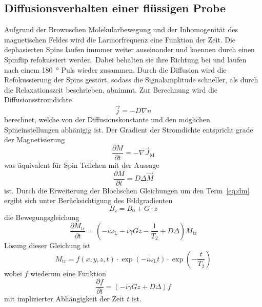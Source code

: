 \subsection{Diffusionsverhalten einer flüssigen Probe}%
\label{sub:relaxationsverhalten_einer_fluessigen_probe}
Aufgrund der Brownschen Molekularbewegung und der Inhomogenität des
magnetischen Feldes wird die Larmorfrequenz eine Funktion der Zeit. 
Die dephasierten Spins laufen immmer weiter auseinander und koennen durch einen
Spinflip refokussiert werden.
Dabei behalten sie ihre Richtung bei und laufen nach einem \SI{180}{\degree}
Puls wieder zusammen.
Durch die Diffusion wird die Refokussierung der Spins gestört, sodass die
Signalamplitude schneller, als durch die Relaxationszeit beschrieben, abnimmt.
Zur Berechnung wird die Diffusionsstromdichte 
\begin{equation}
		\vec{j} = -D \nabla n	
\end{equation}
berechnet, welche von der Diffusionskonstante und den möglichen
Spineinstellungen abhänigig ist. 
Der Gradient der Stromdichte entspricht grade der Magnetisierung
\begin{equation}
		\frac{\partial M}{\partial t} = - \nabla \vec{J}_\text{M}
\end{equation}
was äquivalent für Spin  Teilchen mit der Aussage 
\begin{equation}
		\label{eq:dm}
		\frac{\partial M}{\partial t} = D \Delta \vec{M}
\end{equation}
ist. Durch die Erweiterung der Blochschen Gleichungen um den Term~\ref{eq:dm}
ergibt sich unter Berücksichtigung des Feldgradienten
\begin{equation}
		\label{eq:gradB}
		B_\text{z} = B_0 + G \cdot z
\end{equation}
die Bewegungsgleichung
\begin{equation}
		\frac{\partial M_\text{tr}}{\partial t} = \left(- i \omega_\text{L} - i \gamma
Gz - \frac{1}{T_2} + D \Delta \right) M_\text{tr}
\end{equation}
Lösung dieser Gleichung ist 
\begin{equation}
		M_\text{tr} = f(x,y,z,t) \cdot \exp(-i\omega_\text{L}t) \cdot
		\exp\left(-\frac{t}{T_\text{2}}\right)
\end{equation}
wobei $f$ wiederum eine Funktion  
\begin{equation}
		\frac{\partial f}{\partial t} = \left(-i \gamma Gz + D \Delta \right) f
\end{equation}
mit implizierter Abhängigkeit der Zeit $t$ ist.
